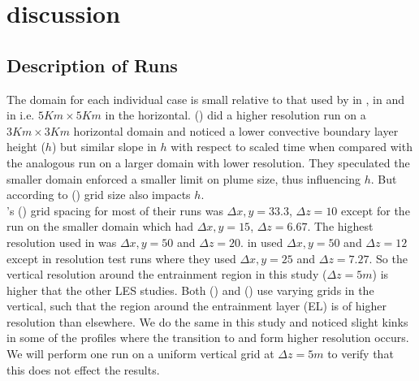 
\chapter{discussion}
\label{ch:results}
\setlength{\parindent}{0cm}

\section{Description of Runs}
\FloatBarrier

The domain for each individual case is small relative to that used by \citeauthor{SullMoengStev} in \cite{SullMoengStev}, \citeauthor{FedConzMir04} in \cite{FedConzMir04} and \citeauthor{BrooksFowler2} in \cite{BrooksFowler2} i.e. $5Km \times 5 Km$ in the horizontal.  \citeauthor{SullMoengStev} (\cite{SullMoengStev}) did a higher resolution run on a $3 Km \times 3 Km$ horizontal domain and noticed a lower convective boundary layer height ($h$) but similar slope in $h$ with respect to scaled time when compared with the analogous run on a larger domain with lower resolution.  They speculated the smaller domain enforced a smaller limit on plume size, thus influencing $h$. But according to \citeauthor{SullPat} (\cite{SullPat}) grid size also impacts $h$. \\


\citeauthor{SullMoengStev}'s (\cite{SullMoengStev}) grid spacing for most of their runs was $\Delta x, y= 33.3$, $\Delta z=10$ except for the run on the smaller domain which had $\Delta x, y = 15$, $\Delta z=6.67$.  The highest resolution \citeauthor{FedConzMir04} used in \cite{FedConzMir04} was $\Delta x, y = 50$ and $\Delta z = 20$.  \citeauthor{BrooksFowler2} in \cite{BrooksFowler2} used $\Delta x, y = 50$ and $\Delta z = 12$ except in resolution test runs where they used $\Delta x, y = 25$ and $\Delta z = 7.27$.  So the vertical resolution around the entrainment region in this study ($\Delta z= 5m$) is higher that the other LES studies. Both \citeauthor{SullMoengStev} (\cite{SullMoengStev}) and \citeauthor{BrooksFowler2} (\cite{BrooksFowler2}) use varying grids in the vertical, such that the region around the entrainment layer (\acs{EL}) is of higher resolution than elsewhere. We do the same in this study and noticed slight kinks in some of the profiles where the transition to and form higher resolution occurs. We will perform one run on a uniform vertical grid at $\Delta z=5m$ to verify that this does not effect the results.\\          


